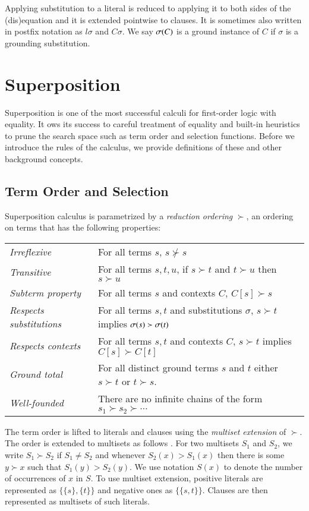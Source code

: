 Applying substitution to a literal is reduced to applying it to both sides of
the (dis)equa\-tion and it is extended pointwise to clauses. It is sometimes
also written in postfix notation as $l\sigma$ and $C\sigma$. We say
$\sigma(C)$ is a ground instance of $C$ if $\sigma$ is a grounding
substitution.

\section{Superposition}

Superposition is one of the most successful calculi for first-order logic with
equality. It ows its success to careful treatment of equality and built-in
heuristics to prune the search space such as term order and selection functions.
Before we introduce the rules of the calculus, we provide definitions of these and other
background concepts.

\subsection{Term Order and Selection}
\label{sec:pre:order}
Superposition calculus is parametrized by a {\em reduction ordering} $\succ$, an
ordering on terms that has the following properties:

\noindent\begin{tabular}{p{}p{}}
    \textit{Irreflexive} & For all terms $s$, $s \not\succ s$ \\
    \textit{Transitive} & For all terms $s, t, u$,  if $s\succ t$ and $t \succ u$ then $s \succ u$ \\ 
    \textit{Subterm property} & For all terms $s$ and contexts $C$, $C[s] \succ s$ \\
    \textit{Respects substitutions} & For all terms $s, t$ and substitutions $\sigma$, $s \succ t$ implies $\sigma(s) \succ \sigma(t)$ \\
    \textit{Respects contexts} & For all terms $s,t$ and contexts $C$, $s \succ t$ implies $C[s] \succ C[t]$ \\
    \textit{Ground total} & For all distinct
    ground terms $s$ and $t$ either $s \succ t$ or $t \succ s$. \\
    \textit{Well-founded} & There are no infinite chains of the form $s_1 \succ s_2 \succ \cdots$ 
\end{tabular}

The term order is lifted to literals and clauses using the {\em multiset extension} of
$\succ$. The order is extended to multisets as follows
\cite[Sect.~2.5]{bg-01-resolution}. For two multisets $S_1$ and $S_2$, we write $S_1 \succ S_2$ if $S_1 \not= S_2$
and whenever $S_2(x) > S_1(x)$ then there is some $y \succ x$ such that $S_1(y)
> S_2(y)$. We use notation $S(x)$ to denote the number of occurrences of $x$ in
$S$. To use multiset extension, positive literals are represented as $ \{ \{s\},
\{t\} \}$ and negative ones as $\{ \{ s, t \} \}$. Clauses are then represented as 
multisets of such literals. 

